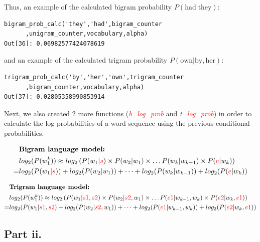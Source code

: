 \documentclass[11pt]{article}
\begin{document}
Thus, an example of the calculated bigram probability $P(\text{had} | \text{they})$:
\begin{verbatim}
bigram_prob_calc('they','had',bigram_counter
      ,unigram_counter,vocabulary,alpha)
Out[36]: 0.06982577424078619
\end{verbatim}

and  an example of the calculated trigram probability $P(\text{own} | \text{by},\text{her})$:
\begin{verbatim}
trigram_prob_calc('by','her','own',trigram_counter
      ,bigram_counter,vocabulary,alpha)
Out[37]: 0.02805358990853914
\end{verbatim}

Next, we also created 2 more functions (\textcolor{red}{\textit{b\_log\_prob}} and \textcolor{red}{\textit{t\_log\_prob}}) in order to calculate the log probabilities of a word sequence using the previous conditional probabilities.

\begin{align*}
&\textbf{Bigram language model: } \\
& log_2(P(w_1^k)) \approx  log_2\left(P(w_1|\textcolor{red}{s}) \times P(w_2|w_1) \times \dots P(w_k|w_{k-1}) \times P(\textcolor{red}{e}|w_k)\right)  \\
= & log_2(P(w_1|\textcolor{red}{s}))+ log_2(P(w_2|w_1))+ \dots + log_2(P(w_k|w_{k-1}))+log_2(P(\textcolor{red}{e}|w_k)) \\
\end{align*}

\begin{align*}
&\textbf{Trigram language model: } \\
& log_2(P(w_1^k)) \approx  log_2\left(P(w_1|\textcolor{red}{s1},\textcolor{red}{s2}) 
\times P(w_2|\textcolor{red}{s2},w_1) 
\times \dots P(\textcolor{red}{e1}|w_{k-1},w_{k}) 
\times P(\textcolor{red}{e2}|w_{k},\textcolor{red}{e1})\right)  \\
= & log_2(P(w_1|\textcolor{red}{s1},\textcolor{red}{s2}) 
+log_2(P(w_2|\textcolor{red}{s2},w_1)) + \dots 
+ log_2(P(\textcolor{red}{e1}|w_{k-1},w_{k}) )
+ log_2(P(\textcolor{red}{e2}|w_{k},\textcolor{red}{e1})) \\
\end{align*}


\newpage
\subsection*{Part ii.}
\end{document}
